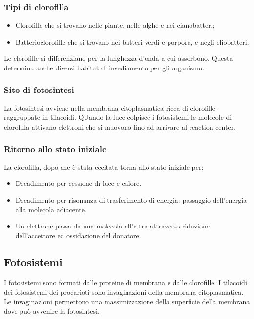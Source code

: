 		\subsubsection{Tipi di clorofilla}
		\begin{multicols}{2}
			\begin{itemize}
 	   			\item Clorofille che si trovano nelle piante, nelle alghe e nei cianobatteri; 
    				\item Batterioclorofille che si trovano nei batteri verdi e porpora, e negli eliobatteri.
			\end{itemize}
		\end{multicols}
		Le clorofille si differenziano per la lunghezza d'onda a cui assorbono.
		Questa determina anche diversi habitat di insediamento per gli organismo.

		\subsubsection{Sito di fotosintesi}
		La fotosintesi avviene nella membrana citoplasmatica ricca di clorofille raggruppate in tilacoidi.
		QUando la luce colpisce i fotosistemi le molecole di clorofilla attivano elettroni che si muovono fino ad arrivare al reaction center.

		\subsubsection{Ritorno allo stato iniziale}
		La clorofilla, dopo che \`e stata eccitata torna allo stato iniziale per:
		\begin{multicols}{2}
			\begin{itemize}
				\item Decadimento per cessione di luce e calore.
				\item Decadimento per risonanza di trasferimento di energia: passaggio dell'energia alla molecola adiacente.
				\item Un elettrone passa da una molecola all'altra attraverso riduzione dell'accettore ed ossidazione del donatore.
			\end{itemize}
		\end{multicols}

	\subsection{Fotosistemi}
	I fotosistemi sono formati dalle proteine di membrana e dalle clorofille.
	I tilacoidi dei fotosistemi dei procarioti sono invaginazioni della membrana citoplasmatica.
	Le invaginazioni permettono una massimizzazione della superficie della membrana dove pu\`o avvenire la fotosintesi.

